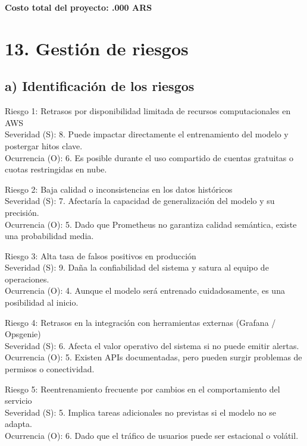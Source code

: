 \documentclass[
11pt, %
]{charter}
\begin{document}
\vspace{0.5cm}

\noindent\textbf{Costo total del proyecto: .000 ARS}


\newpage



\section{13. Gestión de riesgos}
\label{sec:riesgos}

\subsection*{a) Identificación de los riesgos}

Riesgo 1: Retrasos por disponibilidad limitada de recursos computacionales en AWS \\
Severidad (S): 8. Puede impactar directamente el entrenamiento del modelo y postergar hitos clave. \\
Ocurrencia (O): 6. Es posible durante el uso compartido de cuentas gratuitas o cuotas restringidas en nube.

\vspace{0.2cm}
Riesgo 2: Baja calidad o inconsistencias en los datos históricos \\
Severidad (S): 7. Afectaría la capacidad de generalización del modelo y su precisión. \\
Ocurrencia (O): 5. Dado que Prometheus no garantiza calidad semántica, existe una probabilidad media.

\vspace{0.2cm}
Riesgo 3: Alta tasa de falsos positivos en producción \\
Severidad (S): 9. Daña la confiabilidad del sistema y satura al equipo de operaciones. \\
Ocurrencia (O): 4. Aunque el modelo será entrenado cuidadosamente, es una posibilidad al inicio.

\vspace{0.2cm}
Riesgo 4: Retrasos en la integración con herramientas externas (Grafana / Opsgenie) \\
Severidad (S): 6. Afecta el valor operativo del sistema si no puede emitir alertas. \\
Ocurrencia (O): 5. Existen APIs documentadas, pero pueden surgir problemas de permisos o conectividad.

\vspace{0.2cm}
Riesgo 5: Reentrenamiento frecuente por cambios en el comportamiento del servicio \\
Severidad (S): 5. Implica tareas adicionales no previstas si el modelo no se adapta. \\
Ocurrencia (O): 6. Dado que el tráfico de usuarios puede ser estacional o volátil.
\end{document}

